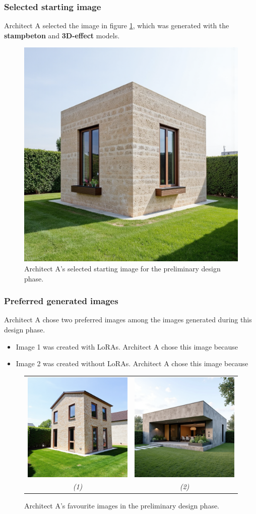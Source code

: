 \subsubsection{Selected starting image}
Architect A selected the image in figure \ref{fig:A-preliminary-selected}, which was generated with the \textbf{stampbeton} and \textbf{3D-effect} models. 
\begin{figure}[H]
    \centering
    \includegraphics[width=0.3\linewidth]{Images/Methodology/Evaluation sessions/DMOA_Fixed-images/2-preliminary_design/Met_lora_00080_.png}
    \caption{Architect A's selected starting image for the preliminary design phase.}
    \label{fig:A-preliminary-selected}
\end{figure}
\subsubsection{Preferred generated images}
Architect A chose two preferred images among the images generated during this design phase. 
\begin{itemize}
    \item Image 1 was created with LoRAs. Architect A chose this image because
    \item Image 2 was created without LoRAs. Architect A chose this image because 
\end{itemize}
\begin{figure}[H]
    \centering
    \begin{tabular}{cc}
         \includegraphics[width=0.3\linewidth]{Images/Results/Architect A/2. Preliminary phase/Met_lora_00004_.png} & \includegraphics[width=0.3\linewidth]{Images/Results/Architect A/2. Preliminary phase/Zonder_lora_00146_.png}\\
         \textit{(1)} & \textit{(2)}
    \end{tabular}
    \caption{Architect A's favourite images in the preliminary design phase.}
    \label{fig:A-preliminary-preferred}
\end{figure}

